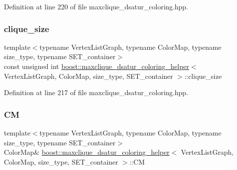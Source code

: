 Definition at line 220 of file maxclique\+\_\+dsatur\+\_\+coloring.\+hpp.

\mbox{\label{classboost_1_1maxclique__dsatur__coloring__helper_a1a0be72747da9f7562b13d9c544e480b}} 
\subsubsection{\texorpdfstring{clique\+\_\+size}{clique\_size}}
{\footnotesize\ttfamily template$<$typename Vertex\+List\+Graph, typename Color\+Map, typename size\+\_\+type, typename S\+E\+T\+\_\+container$>$ \\
const unsigned int \hyperlink{classboost_1_1maxclique__dsatur__coloring__helper}{boost\+::maxclique\+\_\+dsatur\+\_\+coloring\+\_\+helper}$<$ Vertex\+List\+Graph, Color\+Map, size\+\_\+type, S\+E\+T\+\_\+container $>$\+::clique\+\_\+size\hspace{0.3cm}{\ttfamily [private]}}



Definition at line 217 of file maxclique\+\_\+dsatur\+\_\+coloring.\+hpp.

\mbox{\label{classboost_1_1maxclique__dsatur__coloring__helper_aace06ca9eef492772bb27436dc67af3b}} 
\subsubsection{\texorpdfstring{CM}{CM}}
{\footnotesize\ttfamily template$<$typename Vertex\+List\+Graph, typename Color\+Map, typename size\+\_\+type, typename S\+E\+T\+\_\+container$>$ \\
Color\+Map\& \hyperlink{classboost_1_1maxclique__dsatur__coloring__helper}{boost\+::maxclique\+\_\+dsatur\+\_\+coloring\+\_\+helper}$<$ Vertex\+List\+Graph, Color\+Map, size\+\_\+type, S\+E\+T\+\_\+container $>$\+::CM\hspace{0.3cm}{\ttfamily [private]}}



